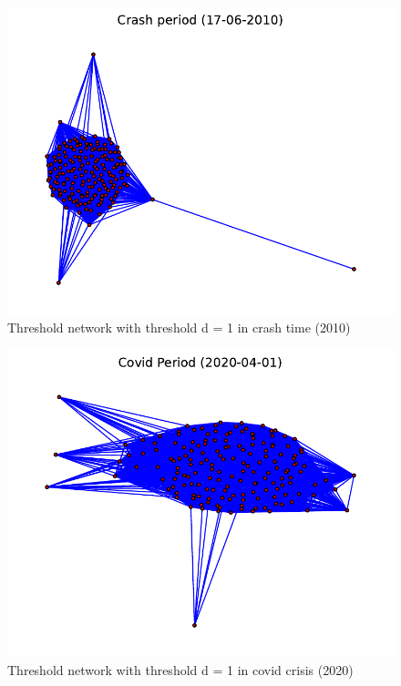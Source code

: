 \documentclass[sigchi]{acmart}
\begin{document}
\begin{figure}[H]
	\centering
	\includegraphics[width=\linewidth]{(3)tresh_crash.pdf}
	\caption{Threshold network with threshold d = 1 in crash time (2010)}
\end{figure}
\begin{figure}[H]
	\centering
	\includegraphics[width=\linewidth]{(4)tresh_covid.pdf}
	\caption{Threshold network with threshold d = 1 in covid crisis (2020)}
\end{figure}
\end{document}
